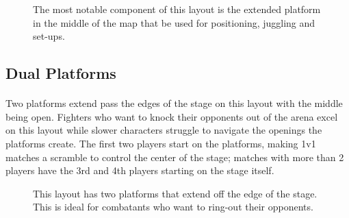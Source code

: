 \begin{figure}[h!]
    \centering
    \caption{The most notable component of this layout is the extended platform in the middle of the map that be used for positioning, juggling and set-ups.}
\end{figure}

\pagebreak

\subsection{Dual Platforms}

\paragraph{} Two platforms extend pass the edges of the stage on this layout with the middle being open. Fighters who want to knock their opponents out of the arena excel on this layout while slower characters struggle to navigate the openings the platforms create. The first two players start on the platforms, making 1v1 matches a scramble to control the center of the stage; matches with more than 2 players have the 3rd and 4th players starting on the stage itself.

\begin{figure}[h!]
    \centering
    \caption{This layout has two platforms that extend off the edge of the stage. This is ideal for combatants who want to ring-out their opponents.}
\end{figure}

